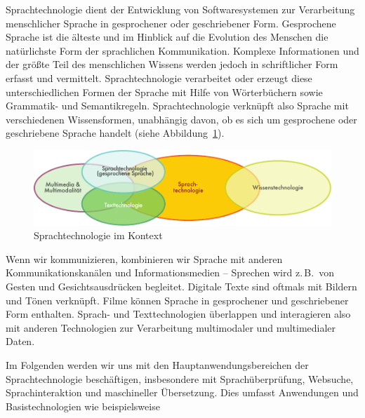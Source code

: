 \documentclass[]{../../metanetpaper}
\begin{document}

\begin{multicols}{2}

Sprachtechnologie dient der Entwicklung von Softwaresystemen zur Verarbeitung menschlicher Sprache in gesprochener oder geschriebener Form. Gesprochene Sprache ist die älteste und im Hinblick auf die Evolution des Menschen die natürlichste Form der sprachlichen Kommunikation. Komplexe Informationen und der größte Teil des menschlichen Wissens werden jedoch in schriftlicher Form erfasst und vermittelt. Sprachtechnologie verarbeitet oder erzeugt diese unterschiedlichen Formen der Sprache mit Hilfe von Wörterbüchern sowie Grammatik- und Semantikregeln. Sprachtechnologie verknüpft also Sprache mit verschiedenen Wissensformen, unabhängig davon, ob es sich um gesprochene oder geschriebene Sprache handelt (siehe Abbildung~\ref{fig:ltincontext_de}).

\begin{figure}[htb]
  \vspace{-25mm}
  \center
  \includegraphics[width=\textwidth]{../_media/german/language_technologies}
  \caption{Sprachtechnologie im Kontext}
  \label{fig:ltincontext_de}
\end{figure}

Wenn wir kommunizieren, kombinieren wir Sprache mit anderen Kommunikationskanälen und Informationsmedien -- Sprechen wird z.\,B.~von Gesten und Gesichtsausdrücken begleitet. Digitale Texte sind oftmals mit Bildern und Tönen verknüpft. Filme können Sprache in gesprochener und geschriebener Form enthalten. Sprach- und Texttechnologien überlappen und interagieren also mit anderen Technologien zur Verarbeitung multimodaler und multimedialer Daten.

Im Folgenden werden wir uns mit den Hauptanwendungsbereichen der Sprachtechnologie beschäftigen, insbesondere mit Sprachüberprüfung, Websuche, Sprach\-inter\-aktion und maschineller Übersetzung. Dies umfasst Anwendungen und Basistechnologien wie beispielsweise


\end{multicols}
\end{document}
